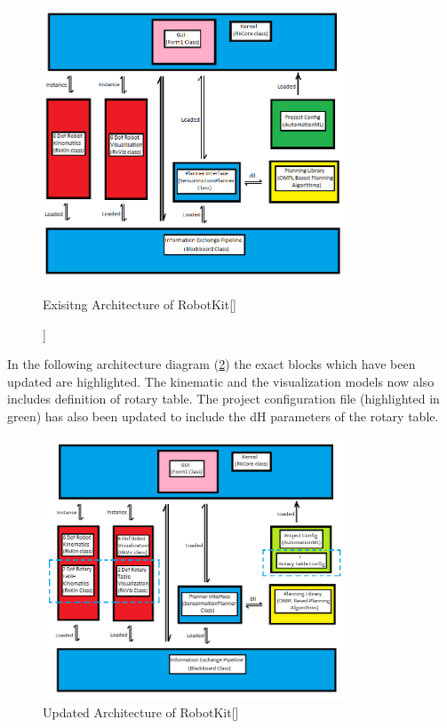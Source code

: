 \begin{figure}[!htbp] %
 \centering
   \includegraphics[width=9cm]{images/Original_arch.png}
   \caption[Exisitng Architecture of RobotKit[\citet{DiazP2016}]]
   {Exisitng Architecture of RobotKit[\citet{DiazP2016}]}  
\label{fig:img9}
\end{figure}

In the following architecture diagram (\ref{fig:img10}) the exact blocks which have been updated are highlighted. The kinematic and the visualization models now also includes definition of rotary table. The project configuration file (highlighted in green) has also been updated to include the dH parameters of the rotary table. 
\begin{figure}[!htbp] %
 \centering
   \includegraphics[width=9cm]{images/new_arch.png}
   \caption[Updated Architecture of RobotKit]
   {Updated Architecture of RobotKit[\citet{DiazP2016}]}  
\label{fig:img10}
\end{figure}
 


